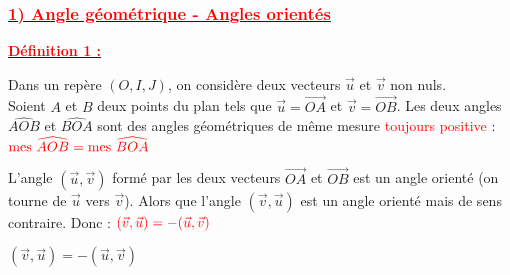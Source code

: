 \documentclass[a4paper,12pt]{article}
\begin{document}
\subsubsection*{\underline{\textcolor{red}{1) Angle géométrique - Angles orientés}}}

\textbf{\underline{\textcolor{red}{Définition 1 :}}}

Dans un repère \( (O, I, J) \), on considère deux vecteurs \( \vec{u} \) et \( \vec{v} \) non nuls.\\
Soient \( A \) et \( B \) deux points du plan tels que \( \vec{u} = \overrightarrow{OA} \) et \( \vec{v} = \overrightarrow{OB} \). Les deux angles \( \widehat{AOB} \) et \( \widehat{BOA} \) sont des angles géométriques de même mesure \textcolor{red}{toujours positive} :
\(\textcolor{red}{\text{mes } \widehat{AOB} = \text{mes } \widehat{BOA}}\)

L’angle \( (\vec{u}, \vec{v}) \) formé par les deux vecteurs \( \overrightarrow{OA} \) et \( \overrightarrow{OB} \) est un angle orienté (on tourne de \( \vec{u} \) vers \( \vec{v} \)). Alors que l’angle \( (\vec{v}, \vec{u}) \) est un angle orienté mais de sens contraire. Donc : \( \textcolor{red}{ (\vec{v}, \vec{u}) = -(\vec{u}, \vec{v})}\)
\begin{tcolorbox}[colback=red!5!white, colframe=red!75!black, title=Propriété 1]
    \( (\vec{v}, \vec{u}) = -(\vec{u}, \vec{v}) \)
\end{tcolorbox}
\vspace{1em}

\begin{center}
\end{center}
\end{document}
